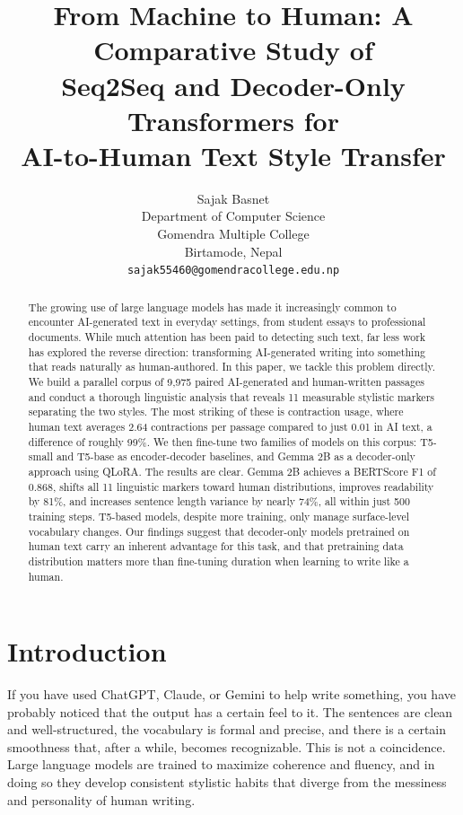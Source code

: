 \documentclass{article}
\title{From Machine to Human: A Comparative Study of\\
Seq2Seq and Decoder-Only Transformers for\\
AI-to-Human Text Style Transfer}
\author{
  Sajak Basnet \\
  Department of Computer Science \\
  {Gomendra Multiple College} \\
  Birtamode, Nepal \\
  \texttt{sajak55460@gomendracollege.edu.np} \\
}
\begin{document}
\maketitle

\begin{abstract}
The growing use of large language models has made it increasingly common to encounter AI-generated text in everyday settings, from student essays to professional documents. While much attention has been paid to detecting such text, far less work has explored the reverse direction: transforming AI-generated writing into something that reads naturally as human-authored. In this paper, we tackle this problem directly. We build a parallel corpus of 9,975 paired AI-generated and human-written passages and conduct a thorough linguistic analysis that reveals 11 measurable stylistic markers separating the two styles. The most striking of these is contraction usage, where human text averages 2.64 contractions per passage compared to just 0.01 in AI text, a difference of roughly 99\%. We then fine-tune two families of models on this corpus: T5-small and T5-base as encoder-decoder baselines, and Gemma 2B as a decoder-only approach using QLoRA. The results are clear. Gemma 2B achieves a BERTScore F1 of 0.868, shifts all 11 linguistic markers toward human distributions, improves readability by 81\%, and increases sentence length variance by nearly 74\%, all within just 500 training steps. T5-based models, despite more training, only manage surface-level vocabulary changes. Our findings suggest that decoder-only models pretrained on human text carry an inherent advantage for this task, and that pretraining data distribution matters more than fine-tuning duration when learning to write like a human.
\end{abstract}

\section{Introduction}

If you have used ChatGPT, Claude, or Gemini to help write something, you have probably noticed that the output has a certain feel to it. The sentences are clean and well-structured, the vocabulary is formal and precise, and there is a certain smoothness that, after a while, becomes recognizable. This is not a coincidence. Large language models are trained to maximize coherence and fluency, and in doing so they develop consistent stylistic habits that diverge from the messiness and personality of human writing.
\end{document}
